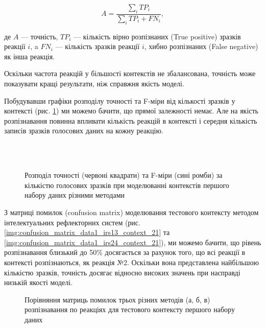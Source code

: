 \begin{equation}
\label{eq:acuracy}
A=\frac{\sum\limits_i TP_i}{\sum\limits_i TP_i+FN_i},
\end{equation}

де $A$ --- точність, $TP_i$ --- кількість вірно розпізнаних (True positive) зразків реакції $i$, a $FN_i$ --- кількість зразків реакції $i$, хибно розпізнаних (False negative) як інша реакція.

Оскільки частота реакцій у більшості контекстів не збалансована, точність може показувати кращі результати, ніж справжня якість моделі.

Побудувавши графіки розподілу точності та F-міри від кількості зразків у контексті (рис. \ref{img:accuracy_distribution_data1}) ми можемо бачити, що прямої залежності немає. Але на якість розпізнавання повинна впливати кількість реакцій в контексті і середня кількість записів зразків голосових даних на кожну реакцію.

\begin{figure}[!t]
	\centering
	\\
	\\
	\caption{Розподіл точності (червоні квадрати) та F-міри (сині ромби) за кількістю голосових зразків при моделюванні контекстів першого набору даних різними методами}
	\label{img:accuracy_distribution_data1}
\end{figure}

З матриці помилок (confusion matrix) \cite{Stehman_1997} моделювання тестового контексту методом інтелектуальних рефлекторних систем (рис. \ref{img:confusion_matrix_data1_irs13_context_21} та \ref{img:confusion_matrix_data1_irs24_context_21}), ми можемо бачити, що рівень розпізнавання близький до 50\% досягається за рахунок того, що всі реакції в контексті розпізнаються, як реакція №2. Оскільки вона представлена найбільшою кількістю зразків, точність досягає відносно високих значень при насправді низькій якості моделі.

\begin{figure}[!t]
	\centering
	
	\caption{Порівняння матриць помилок трьох різних методів (а, б, в) розпізнавання по реакціях для тестового контексту першого набору даних}
	\label{img:confusion_matrix_data1_context_21}
\end{figure}

